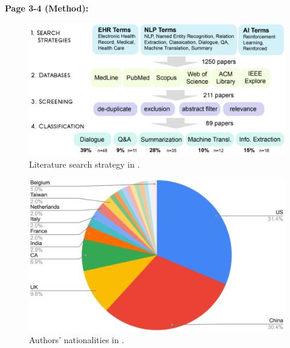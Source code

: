     \textbf{Page 3-4 (Method):}
    \begin{figure}[H]
        \centering
        \includegraphics[width=1\textwidth]{figures/SR0022US23/fig2.png}
        \caption{Literature search strategy in \cite{x090}.}
        \label{fig2:SR0022US23}
    \end{figure}
    \begin{figure}[H]
        \centering
        \includegraphics[width=1\textwidth]{figures/SR0022US23/fig3.png}
        \caption{Authors' nationalities in \cite{x090}.}
        \label{fig3:SR0022US23}
    \end{figure}
    
